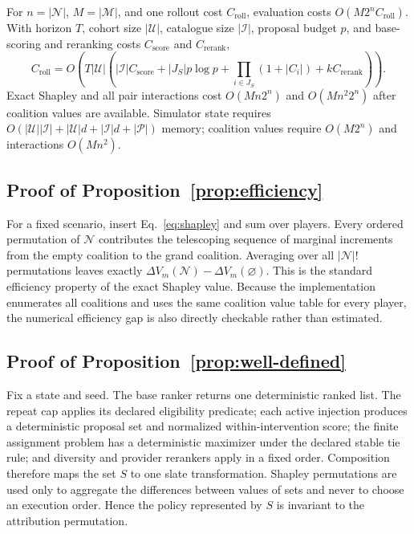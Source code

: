 \documentclass[review]{elsarticle}
\theoremstyle{plain}
\theoremstyle{definition}
\theoremstyle{remark}
\newcommand{\Players}{\mathcal{N}}
\newcommand{\Models}{\mathcal{M}}
\newcommand{\Utility}{V}
\begin{document}
\begin{appendices}
For $n=|\Players|$, $M=|\Models|$, and one rollout cost $C_{\mathrm{roll}}$, evaluation costs $O(M2^nC_{\mathrm{roll}})$. With horizon $T$, cohort size $|\mathcal U|$, catalogue size $|\mathcal I|$, proposal budget $p$, and base-scoring and reranking costs $C_{\mathrm{score}}$ and $C_{\mathrm{rerank}}$,
\begin{equation}
 C_{\mathrm{roll}}=O\!\left(T|\mathcal U|\left(|\mathcal I|C_{\mathrm{score}}+|J_S|p\log p+\textstyle\prod_{i\in J_S}(1+|C_i|)+kC_{\mathrm{rerank}}\right)\right).
\label{eq:croll}
\end{equation}
Exact Shapley and all pair interactions cost $O(Mn2^n)$ and $O(Mn^2 2^n)$ after coalition values are available. Simulator state requires $O(|\mathcal U||\mathcal I|+|\mathcal U|d+|\mathcal I|d+|\mathcal P|)$ memory; coalition values require $O(M2^n)$ and interactions $O(Mn^2)$.

\subsection*{Proof of Proposition~\ref{prop:efficiency}}
For a fixed scenario, insert Eq.~\eqref{eq:shapley} and sum over players. Every ordered permutation of $\Players$ contributes the telescoping sequence of marginal increments from the empty coalition to the grand coalition. Averaging over all $|\Players|!$ permutations leaves exactly $\Delta\Utility_m(\Players)-\Delta\Utility_m(\varnothing)$. This is the standard efficiency property of the exact Shapley value. Because the implementation enumerates all coalitions and uses the same coalition value table for every player, the numerical efficiency gap is also directly checkable rather than estimated.

\subsection*{Proof of Proposition~\ref{prop:well-defined}}
Fix a state and seed. The base ranker returns one deterministic ranked list. The repeat cap applies its declared eligibility predicate; each active injection produces a deterministic proposal set and normalized within-intervention score; the finite assignment problem has a deterministic maximizer under the declared stable tie rule; and diversity and provider rerankers apply in a fixed order. Composition therefore maps the set $S$ to one slate transformation. Shapley permutations are used only to aggregate the differences between values of sets and never to choose an execution order. Hence the policy represented by $S$ is invariant to the attribution permutation.


\end{appendices}
\end{document}
